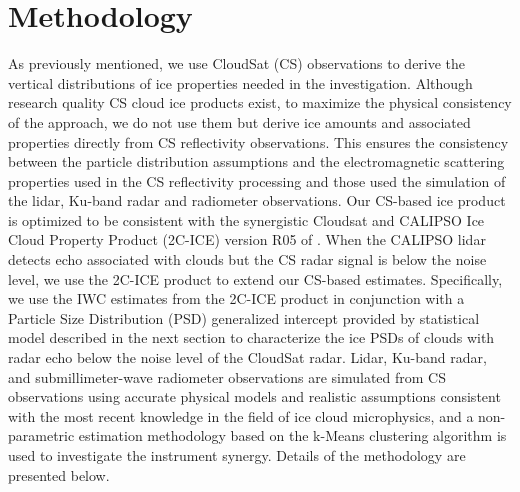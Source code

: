 \documentclass{ametsocV6.1}
\begin{document}
\section{Methodology}
As previously mentioned, we use CloudSat (CS) observations \citep{stephens2002} to derive the vertical distributions of ice properties needed in the investigation.  Although research quality CS cloud ice products exist, to maximize the physical consistency of the approach, we do not use them but derive ice amounts and associated properties directly from CS reflectivity observations.  This ensures the consistency between the particle distribution assumptions and the electromagnetic scattering properties used in the CS reflectivity processing and those used the simulation of the lidar, Ku-band radar and radiometer observations. Our CS-based ice product is optimized to be consistent with the synergistic Cloudsat and CALIPSO Ice Cloud Property Product (2C-ICE) version R05 of \cite{deng2015}.  When the CALIPSO lidar detects echo associated with clouds but the CS radar signal is below the noise level, we use the 2C-ICE product to extend our CS-based estimates. Specifically, we use the IWC estimates from the 2C-ICE product in conjunction with a Particle Size Distribution (PSD) generalized intercept \citep{testud2001} provided by statistical model described in the next section to characterize the ice PSDs of clouds with radar echo below the noise level of the CloudSat radar. Lidar, Ku-band radar, and submillimeter-wave radiometer observations are simulated from CS observations using accurate physical models and realistic assumptions consistent with the most recent knowledge in the field of ice cloud microphysics, and a non-parametric estimation methodology based on the k-Means clustering algorithm \cite{mackay2003information} is used to investigate the instrument synergy.  Details of the methodology are presented below.
\end{document}
